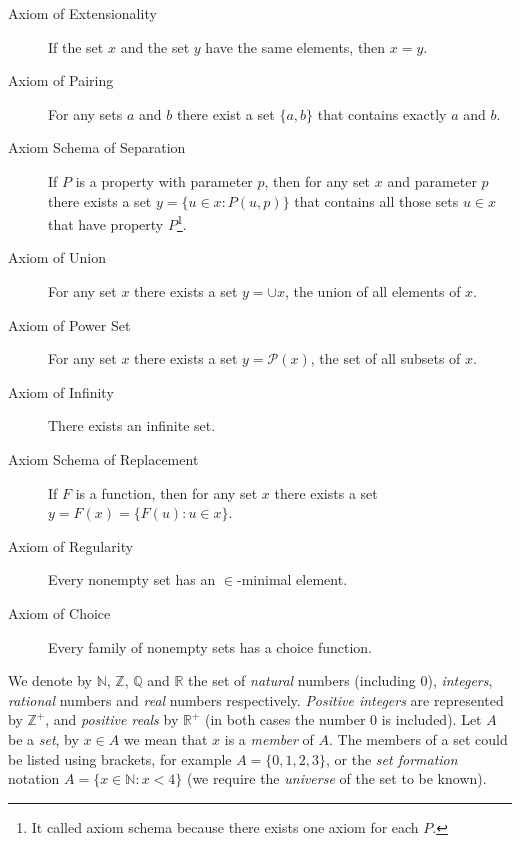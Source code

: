\begin{description}

\item[Axiom of Extensionality] If the set $x$ and the set $y$ have the same elements, then $x=y$.

\item[Axiom of Pairing] For any sets $a$ and $b$ there exist a set $\{a, b\}$ that contains exactly $a$ and $b$.

\item[Axiom Schema of Separation] If $P$ is a property with parameter $p$, then for any set $x$ and parameter $p$ there exists a set $y=\{u \in x : P(u,p) \}$ that contains all those sets $u \in x$ that have property $P$\footnote{It called axiom schema because there exists one axiom for each $P$.}.

\item[Axiom of Union] For any set $x$ there exists a set $y = \cup x$, the union of all elements of $x$. 

\item[Axiom of Power Set] For any set $x$ there exists a set $y = \mathcal{P}(x)$, the set of all subsets of $x$.

\item[Axiom of Infinity] There exists an infinite set.

\item[Axiom Schema of Replacement] If $F$ is a function, then for any set $x$ there exists a set $y = F(x) = \{F(u) : u \in x \}$. 

\item[Axiom of Regularity] Every nonempty set has an $\in$-minimal element.

\item[Axiom of Choice] Every family of nonempty sets has a choice function.

\end{description}


We denote by $\mathbb{N}$, $\mathbb{Z}$, $\mathbb{Q}$ and $\mathbb{R}$ the set of \emph{natural} numbers (including $0$), \emph{integers}, \emph{rational} numbers and \emph{real} numbers respectively. \emph{Positive integers} are represented by $\mathbb{Z}^+$, and \emph{positive reals} by $\mathbb{R}^+$ (in both cases the number $0$ is included). Let $A$ be a \emph{set}, by $x\in A$ we mean that $x$ is a \emph{member} of $A$. The members of a set could be listed using brackets, for example $A = \{0, 1, 2, 3\}$, or the \emph{set formation} notation $A = \{x \in \mathbb{N} : x < 4\}$ (we require the \emph{universe} of the set to be known).

